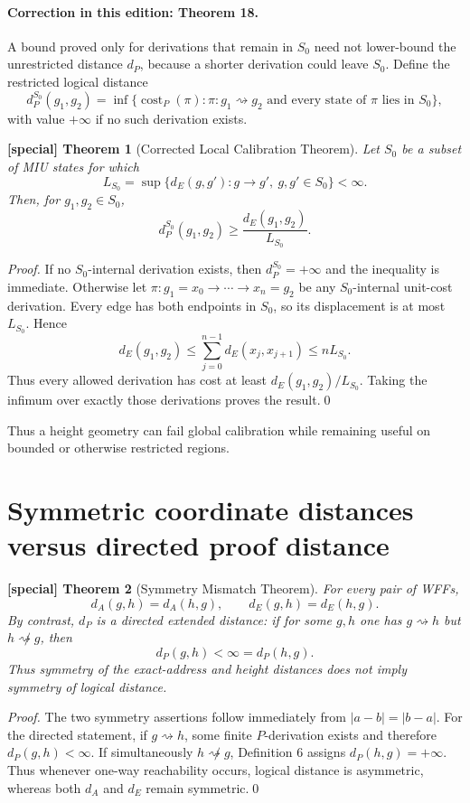 \documentclass[11pt]{article}
\newtheorem{spthm}{[special] Theorem}
\newcommand{\dA}{d_A}
\newcommand{\dE}{d_E}
\begin{document}
\paragraph{Correction in this edition: Theorem 18.}
A bound proved only for derivations that remain in $S_0$ need not lower-bound the unrestricted distance $d_P$, because a shorter derivation could leave $S_0$. Define the restricted logical distance
\[
d_P^{S_0}(g_1,g_2)=\inf\{\operatorname{cost}_P(\pi):\pi:g_1\rightsquigarrow g_2\text{ and every state of }\pi\text{ lies in }S_0\},
\]
with value $+\infty$ if no such derivation exists.

\begin{spthm}[Corrected Local Calibration Theorem]
Let $S_0$ be a subset of MIU states for which
\[
L_{S_0}=\sup\{\dE(g,g'):g\to g',\ g,g'\in S_0\}<\infty.
\]
Then, for $g_1,g_2\in S_0$,
\[
d_P^{S_0}(g_1,g_2)\ge\frac{\dE(g_1,g_2)}{L_{S_0}}.
\]
\end{spthm}
\textit{Proof.} If no $S_0$-internal derivation exists, then $d_P^{S_0}=+\infty$ and the inequality is immediate. Otherwise let $\pi:g_1=x_0\to\cdots\to x_n=g_2$ be any $S_0$-internal unit-cost derivation. Every edge has both endpoints in $S_0$, so its displacement is at most $L_{S_0}$. Hence
\[
\dE(g_1,g_2)\le\sum_{j=0}^{n-1}\dE(x_j,x_{j+1})\le nL_{S_0}.
\]
Thus every allowed derivation has cost at least $\dE(g_1,g_2)/L_{S_0}$. Taking the infimum over exactly those derivations proves the result.\qed

Thus a height geometry can fail global calibration while remaining useful on bounded or otherwise restricted regions.

\section{Symmetric coordinate distances versus directed proof distance}
\begin{spthm}[Symmetry Mismatch Theorem]
For every pair of WFFs,
\[\dA(g,h)=\dA(h,g),\qquad \dE(g,h)=\dE(h,g).\]
By contrast, $d_P$ is a directed extended distance: if for some $g,h$ one has $g\rightsquigarrow h$ but $h\not\rightsquigarrow g$, then
\[
d_P(g,h)<\infty=d_P(h,g).
\]
Thus symmetry of the exact-address and height distances does not imply symmetry of logical distance.
\end{spthm}
\textit{Proof.} The two symmetry assertions follow immediately from $|a-b|=|b-a|$. For the directed statement, if $g\rightsquigarrow h$, some finite $P$-derivation exists and therefore $d_P(g,h)<\infty$. If simultaneously $h\not\rightsquigarrow g$, Definition 6 assigns $d_P(h,g)=+\infty$. Thus whenever one-way reachability occurs, logical distance is asymmetric, whereas both $d_A$ and $d_E$ remain symmetric.\qed
\end{document}
